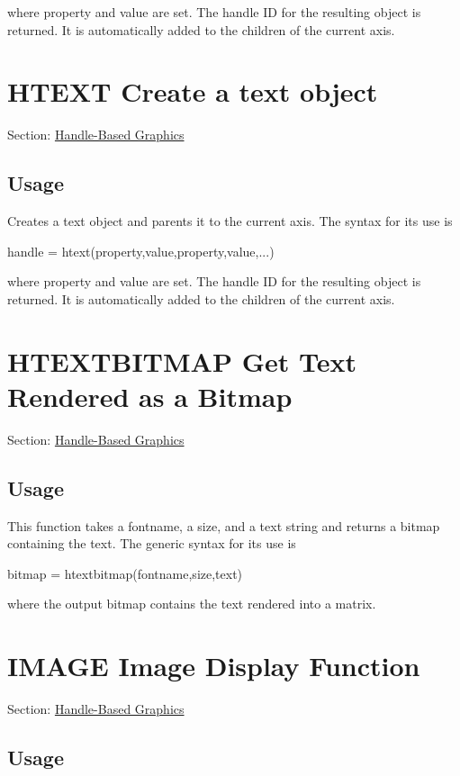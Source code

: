  where {\ttfamily property} and {\ttfamily value} are set. The handle I\-D for the resulting object is returned. It is automatically added to the children of the current axis. \hypertarget{handle_htext}{}\section{H\-T\-E\-X\-T Create a text object}\label{handle_htext}
Section\-: \hyperlink{sec_handle}{Handle-\/\-Based Graphics} \hypertarget{vtkwidgets_vtkxyplotwidget_Usage}{}\subsection{Usage}\label{vtkwidgets_vtkxyplotwidget_Usage}
Creates a text object and parents it to the current axis. The syntax for its use is \begin{DoxyVerb}  handle = htext(property,value,property,value,...)
\end{DoxyVerb}
 where {\ttfamily property} and {\ttfamily value} are set. The handle I\-D for the resulting object is returned. It is automatically added to the children of the current axis. \hypertarget{handle_htextbitmap}{}\section{H\-T\-E\-X\-T\-B\-I\-T\-M\-A\-P Get Text Rendered as a Bitmap}\label{handle_htextbitmap}
Section\-: \hyperlink{sec_handle}{Handle-\/\-Based Graphics} \hypertarget{vtkwidgets_vtkxyplotwidget_Usage}{}\subsection{Usage}\label{vtkwidgets_vtkxyplotwidget_Usage}
This function takes a fontname, a size, and a text string and returns a bitmap containing the text. The generic syntax for its use is \begin{DoxyVerb}  bitmap = htextbitmap(fontname,size,text)
\end{DoxyVerb}
 where the output bitmap contains the text rendered into a matrix. \hypertarget{handle_image}{}\section{I\-M\-A\-G\-E Image Display Function}\label{handle_image}
Section\-: \hyperlink{sec_handle}{Handle-\/\-Based Graphics} \hypertarget{vtkwidgets_vtkxyplotwidget_Usage}{}\subsection{Usage}\label{vtkwidgets_vtkxyplotwidget_Usage}
